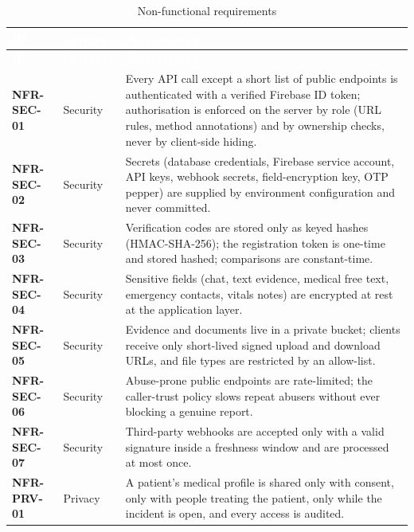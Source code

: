 {\tabfont\rowband
\begin{longtable}{@{}>{\raggedright\arraybackslash}p{}>{\raggedright\arraybackslash}p{}>{\raggedright\arraybackslash}p{}@{}}
\caption{Non-functional requirements}\label{tab:nfr}\\
\rowcolor{najdanavy}\textcolor{white}{\sffamily\bfseries\small ID} & \textcolor{white}{\sffamily\bfseries\small Category} & \textcolor{white}{\sffamily\bfseries\small Requirement}\\
\endfirsthead
\rowcolor{najdanavy}\textcolor{white}{\sffamily\bfseries\small ID} & \textcolor{white}{\sffamily\bfseries\small Category} & \textcolor{white}{\sffamily\bfseries\small Requirement}\\
\endhead
\bottomrule\endlastfoot
\textbf{NFR-SEC-01} & Security & Every API call except a short list of public endpoints is authenticated with a verified Firebase ID token; authorisation is enforced on the server by role (URL rules, method annotations) and by ownership checks, never by client-side hiding.\\
\textbf{NFR-SEC-02} & Security & Secrets (database credentials, Firebase service account, API keys, webhook secrets, field-encryption key, OTP pepper) are supplied by environment configuration and never committed.\\
\textbf{NFR-SEC-03} & Security & Verification codes are stored only as keyed hashes (HMAC-SHA-256); the registration token is one-time and stored hashed; comparisons are constant-time.\\
\textbf{NFR-SEC-04} & Security & Sensitive fields (chat, text evidence, medical free text, emergency contacts, vitals notes) are encrypted at rest at the application layer.\\
\textbf{NFR-SEC-05} & Security & Evidence and documents live in a private bucket; clients receive only short-lived signed upload and download URLs, and file types are restricted by an allow-list.\\
\textbf{NFR-SEC-06} & Security & Abuse-prone public endpoints are rate-limited; the caller-trust policy slows repeat abusers without ever blocking a genuine report.\\
\textbf{NFR-SEC-07} & Security & Third-party webhooks are accepted only with a valid signature inside a freshness window and are processed at most once.\\
\textbf{NFR-PRV-01} & Privacy & A patient’s medical profile is shared only with consent, only with people treating the patient, only while the incident is open, and every access is audited.\\

\end{longtable}}
